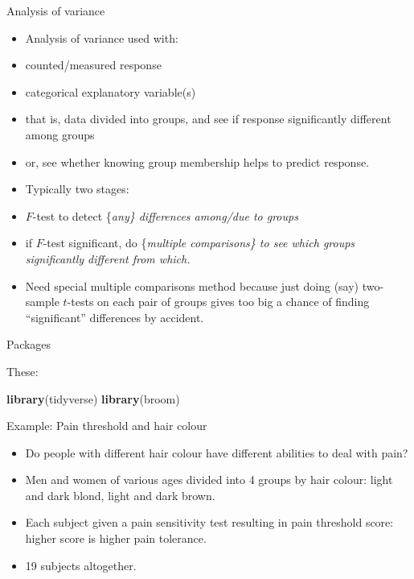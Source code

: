 \documentclass[ignorenonframetext,]{beamer}
\newenvironment{Shaded}{\begin{snugshade}}{\end{snugshade}}
\newcommand{\KeywordTok}[1]{\textcolor[rgb]{0.13,0.29,0.53}{\textbf{#1}}}
\newcommand{\NormalTok}[1]{#1}
\begin{document}
\begin{frame}{Analysis of variance}
\protect\hypertarget{analysis-of-variance}{}

\begin{itemize}
\item
  Analysis of variance used with:
\item
  counted/measured response
\item
  categorical explanatory variable(s)
\item
  that is, data divided into groups, and see if response significantly
  different among groups
\item
  or, see whether knowing group membership helps to predict response.
\item
  Typically two stages:
\item
  \(F\)-test to detect \{\em any\} differences among/due to groups
\item
  if \(F\)-test significant, do \{\em multiple comparisons\} to see
  which groups significantly different from which.
\item
  Need special multiple comparisons method because just doing (say)
  two-sample \(t\)-tests on each pair of groups gives too big a chance
  of finding ``significant'' differences by accident.
\end{itemize}

\end{frame}

\begin{frame}[fragile]{Packages}
\protect\hypertarget{packages-2}{}

These:

\begin{Shaded}
\begin{Highlighting}[]
\KeywordTok{library}\NormalTok{(tidyverse)}
\KeywordTok{library}\NormalTok{(broom)}
\end{Highlighting}
\end{Shaded}

\end{frame}

\begin{frame}{Example: Pain threshold and hair colour}
\protect\hypertarget{example-pain-threshold-and-hair-colour}{}

\begin{itemize}
\item
  Do people with different hair colour have different abilities to deal
  with pain?
\item
  Men and women of various ages divided into 4 groups by hair colour:
  light and dark blond, light and dark brown.
\item
  Each subject given a pain sensitivity test resulting in pain threshold
  score: higher score is higher pain tolerance.
\item
  19 subjects altogether.
\end{itemize}

\end{frame}
\end{document}
